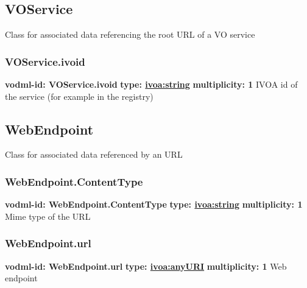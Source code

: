   \subsection{VOService}
  \label{sect:VOService}
    Class for associated data referencing the root URL of a  VO service

    \subsubsection{VOService.ivoid}
      \textbf{vodml-id: VOService.ivoid} \newline
      \textbf{type: \hyperref[sect:ivoa]{ivoa:string}} \newline
      \textbf{multiplicity: 1} \newline 
      IVOA id of the service (for example in the registry)

  \subsection{WebEndpoint}
  \label{sect:WebEndpoint}
    Class for associated data referenced by an URL

    \subsubsection{WebEndpoint.ContentType}
      \textbf{vodml-id: WebEndpoint.ContentType} \newline
      \textbf{type: \hyperref[sect:ivoa]{ivoa:string}} \newline
      \textbf{multiplicity: 1} \newline 
      Mime type of the URL

    \subsubsection{WebEndpoint.url}
      \textbf{vodml-id: WebEndpoint.url} \newline
      \textbf{type: \hyperref[sect:ivoa]{ivoa:anyURI}} \newline
      \textbf{multiplicity: 1} \newline 
      Web endpoint

